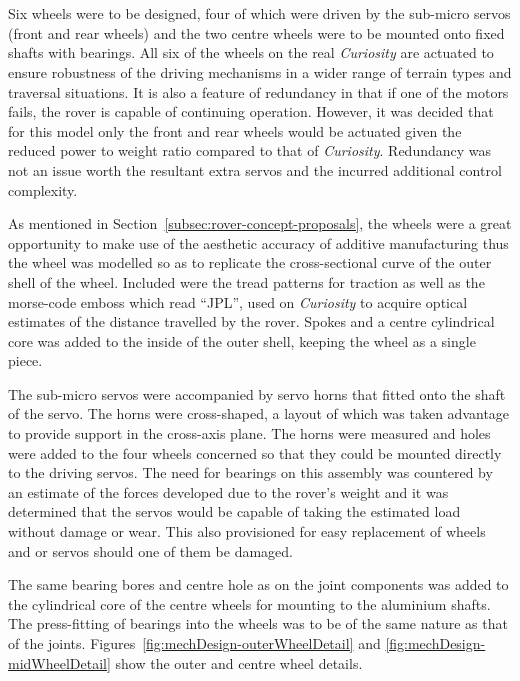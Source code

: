       \\\\
        Six wheels were to be designed, four of which were driven by the sub-micro servos (front and rear wheels) and the two centre wheels were to be mounted onto fixed shafts with bearings. All six of the wheels on the real \textit{Curiosity} are actuated to ensure robustness of the driving mechanisms in a wider range of terrain types and traversal situations. It is also a feature of redundancy in that if one of the motors fails, the rover is capable of continuing operation. However, it was decided that for this model only the front and rear wheels would be actuated given the reduced power to weight ratio compared to that of \textit{Curiosity}. Redundancy was not an issue worth the resultant extra servos and the incurred additional control complexity.
        
        As mentioned in Section~\ref{subsec:rover-concept-proposals}, the wheels were a great opportunity to make use of the aesthetic accuracy of additive manufacturing thus the wheel was modelled so as to replicate the cross-sectional curve of the outer shell of the wheel. Included were the tread patterns for traction as well as the morse-code emboss which read ``JPL'', used on \textit{Curiosity} to acquire optical estimates of the distance travelled by the rover. Spokes and a centre cylindrical core was added to the inside of the outer shell, keeping the wheel as a single piece.
        
        The sub-micro servos were accompanied by servo horns that fitted onto the shaft of the servo. The horns were cross-shaped, a layout of which was taken advantage to provide support in the cross-axis plane. The horns were measured and holes were added to the four wheels concerned so that they could be mounted directly to the driving servos. The need for bearings on this assembly was countered by an estimate of the forces developed due to the rover's weight and it was determined that the servos would be capable of taking the estimated load without damage or wear. This also provisioned for easy replacement of wheels and or servos should one of them be damaged.
        
        The same bearing bores and centre hole as on the joint components was added to the cylindrical core of the centre wheels for mounting to the aluminium shafts. The press-fitting of bearings into the wheels was to be of the same nature as that of the joints. Figures~\ref{fig:mechDesign-outerWheelDetail} and \ref{fig:mechDesign-midWheelDetail} show the outer and centre wheel details.
        
